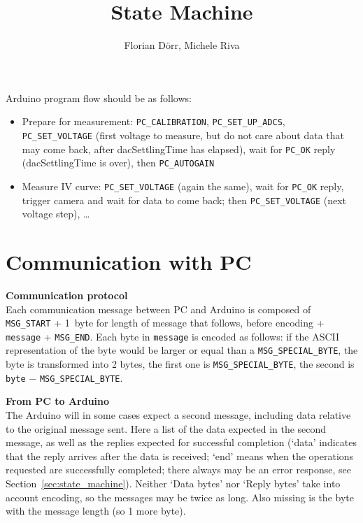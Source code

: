 \documentclass[11pt,a4paper,english]{article}
\author{Florian D\"orr, Michele Riva}
\title{State Machine}
\begin{document}
\titlepage

Arduino program flow should be as follows:
\begin{itemize}
\item Prepare for measurement: \texttt{PC\_CALIBRATION}, \texttt{PC\_SET\_UP\_ADCS}, \texttt{PC\_SET\_VOLTAGE} (first voltage to measure, but do not care about data that may come back, after dacSettlingTime has elapsed), wait for \texttt{PC\_OK} reply (dacSettlingTime is over), then \texttt{PC\_AUTOGAIN}
\item Measure IV curve: \texttt{PC\_SET\_VOLTAGE} (again the same), wait for \texttt{PC\_OK} reply, trigger camera and wait for data to come back; then \texttt{PC\_SET\_VOLTAGE} (next voltage step), \ldots
\end{itemize}

\section{Communication with PC}
\textbf{Communication protocol}\\Each communication message between PC and Arduino is composed of \texttt{MSG\_START} + 1~byte for length of message that follows, before encoding + \texttt{message} + \texttt{MSG\_END}. Each byte in \texttt{message} is encoded as follows: if the ASCII representation of the byte would be larger or equal than a \texttt{MSG\_SPECIAL\_BYTE}, the byte is transformed into 2 bytes, the first one is \texttt{MSG\_SPECIAL\_BYTE}, the second is \texttt{byte} $-$ \texttt{MSG\_SPECIAL\_BYTE}.

\vspace*{\baselineskip}
\noindent\textbf{From PC to Arduino}\\The Arduino will in some cases expect a second message, including data relative to the original message sent. Here a list of the data expected in the second message, as well as the replies expected for successful completion (`data' indicates that the reply arrives after the data is received; `end' means when the operations requested are successfully completed; there always may be an error response, see Section~\ref{sec:state_machine}). Neither `Data bytes' nor `Reply bytes' take into account encoding, so the messages may be twice as long. Also missing is the byte with the message length (so 1 more byte).
\end{document}
